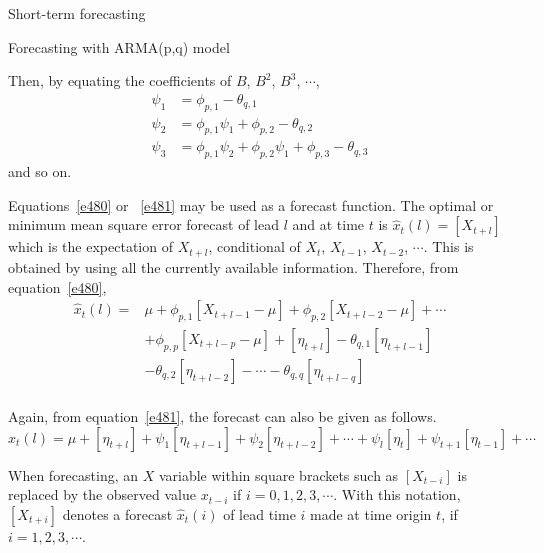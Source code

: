 \documentclass[8pt]{beamer}
\renewcommand{\emph}[1]{\textcolor{myorange}{#1}}
\begin{document}
 \begin{frame}{Short-term forecasting}
    \begin{block}{Forecasting with ARMA(p,q) model}
    \end{block}
    Then, by equating the coefficients of $B$, $B^2$, $B^3$, $\cdots$,
 \begin{equation}
         \begin{aligned}
             \psi_1 &= \phi_{p,1} - \theta_{q,1}\\
             \psi_2 &= \phi_{p,1}\psi_1 + \phi_{p,2} - \theta_{q,2}\\
             \psi_3 &= \phi_{p,1}\psi_2 + \phi_{p,2}\psi_1 + \phi_{p,3} - \theta_{q,3}
         \end{aligned}
            \label{e483}
        \end{equation}
        and so on. 

        Equations~\ref{e480} or ~\ref{e481} may be used as a forecast function. The \emph{optimal or minimum mean square error forecast} of lead $l$ and at time $t$ is $\hat{x}_t (l) = [X_{t+l}]$ which is the expectation of $X_{t+l}$, conditional of $X_t$, $X_{t-1}$, $X_{t-2}$, $\cdots$. This is obtained by using all the currently available information. Therefore, from equation~\ref{e480},
     \begin{equation}
         \begin{aligned}
             \hat{x}_t (l) = &\mu + \phi_{p,1} \left[ X_{t+l-1} - \mu \right] + \phi_{p,2} \left[ X_{t+l-2} - \mu \right] + \cdots\\
                             & + \phi_{p,p} \left[ X_{t+l-p} - \mu \right] + [\eta_{t+l}] - \theta_{q,1} [\eta_{t+l-1}] \\
                             & - \theta_{q,2} [\eta_{t+l-2}] - \cdots -\theta_{q,q} [\eta_{t+l-q}] \\
         \end{aligned}
            \label{e484}
        \end{equation}
        
        Again, from equation~\ref{e481}, the \emph{forecast} can also be given as follows.
 \begin{equation}
     \hat{x}_t (l) = \mu + [\eta_{t+l}] + \psi_1 [\eta_{t+l-1}] + \psi_2[\eta_{t+l-2}] + \cdots + \psi_l [\eta_t] + \psi_{t+1} [\eta_{t-1}] + \cdots
           \label{e485}
        \end{equation}
        
        When \emph{forecasting}, an $X$ variable within square brackets such as $[X_{t-i}]$ is replaced by the observed value $x_{t-i}$ if $i=0,1,2,3, \cdots$. With this notation, $[X_{t+i}]$ denotes a \emph{forecast} $\hat{x}_t (i)$ of lead time $i$ made at time origin $t$, if $i=1,2,3, \cdots$.
     
\end{frame}
\end{document}
